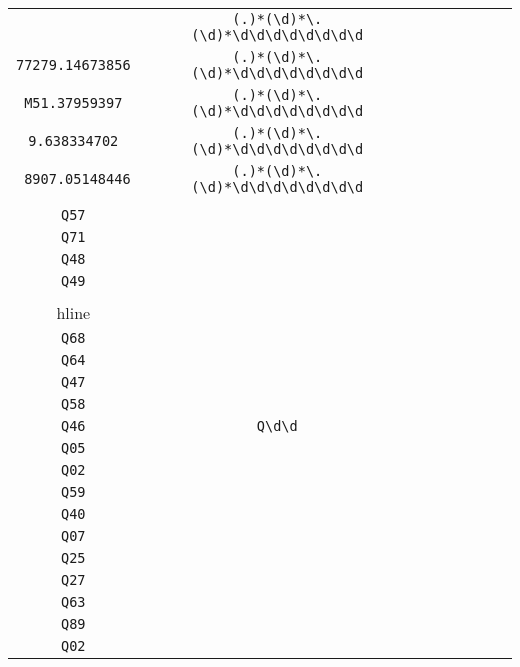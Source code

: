 \begin{longtable}{cccccccc}
\begin{tabular}{ll}
    \verb|.3968559008| & \verb|(.)*(\d)*\.(\d)*\d\d\d\d\d\d\d\d|\\
\verb|77279.14673856| & \verb|(.)*(\d)*\.(\d)*\d\d\d\d\d\d\d\d|\\
\verb|M51.37959397| & \verb|(.)*(\d)*\.(\d)*\d\d\d\d\d\d\d\d|\\
\verb|9.638334702| & \verb|(.)*(\d)*\.(\d)*\d\d\d\d\d\d\d\d|\\
\verb| 8907.05148446| & \verb|(.)*(\d)*\.(\d)*\d\d\d\d\d\d\d\d|
\end{tabular}
\\\midrule 
\begin{tabular}{l}
    \verb|Q65|\\
\verb|Q57|\\
\verb|Q71|\\
\verb|Q48|\\
\verb|Q49|\\
\\hline\\
\verb|Q68|\\
\verb|Q64|\\
\verb|Q47|\\
\verb|Q58|\\
\verb|Q46|
\end{tabular}

&
\verb|Q\d\d|
&

\begin{tabular}{l}
    \verb|Q\d\d|\\
\verb|Q05|\\
\verb|Q02|\\
\verb|Q59|\\
\verb|Q40|\\
\verb|Q07|
\end{tabular}

&

\begin{tabular}{l}
    \verb|Q\d\d|\\
\verb|Q25|\\
\verb|Q27|\\
\verb|Q63|\\
\verb|Q89|\\
\verb|Q02|
\end{tabular}

&


\end{longtable}
